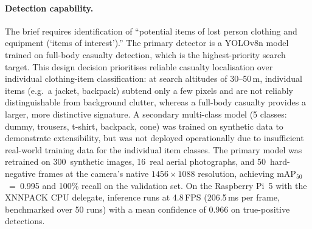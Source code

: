 \paragraph{Detection capability.} The brief requires identification of ``potential items of lost person clothing and equipment (`items of interest').'' The primary detector is a YOLOv8n model trained on full-body casualty detection, which is the highest-priority search target. This design decision prioritises reliable casualty localisation over individual clothing-item classification: at search altitudes of 30--50\,m, individual items (e.g.\ a jacket, backpack) subtend only a few pixels and are not reliably distinguishable from background clutter, whereas a full-body casualty provides a larger, more distinctive signature. A secondary multi-class model (5 classes: dummy, trousers, t-shirt, backpack, cone) was trained on synthetic data to demonstrate extensibility, but was not deployed operationally due to insufficient real-world training data for the individual item classes. The primary model was retrained on 300~synthetic images, 16~real aerial photographs, and 50~hard-negative frames at the camera's native $1456\times1088$ resolution, achieving mAP$_{50}$~=~0.995 and 100\% recall on the validation set. On the Raspberry Pi~5 with the XNNPACK CPU delegate, inference runs at 4.8\,FPS (206.5\,ms per frame, benchmarked over 50 runs) with a mean confidence of 0.966 on true-positive detections.


